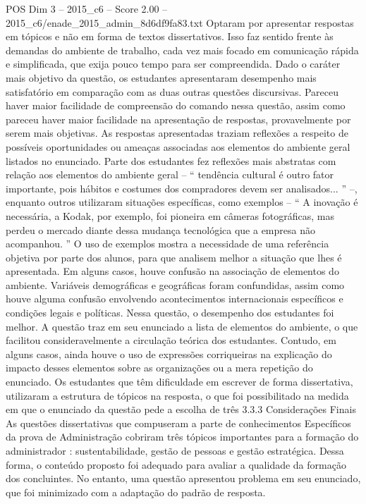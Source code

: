 \begin{textsample}{POS Dim 3 – 2015\_c6 – Score 2.00 – 2015\_c6/enade\_2015\_admin\_8d6df9fa83.txt}
Optaram por apresentar respostas em tópicos e não em forma de textos dissertativos.
Isso faz sentido frente às demandas do ambiente de trabalho, cada vez mais focado em comunicação rápida e simplificada, que exija pouco tempo para ser compreendida.
Dado o caráter mais objetivo da questão, os estudantes apresentaram desempenho mais satisfatório em comparação com as duas outras questões discursivas.
Pareceu haver maior facilidade de compreensão do comando nessa questão, assim como pareceu haver maior facilidade na apresentação de respostas, provavelmente por serem mais objetivas.
As respostas apresentadas traziam reflexões a respeito de possíveis oportunidades ou ameaças associadas aos elementos do ambiente geral listados no enunciado.
Parte dos estudantes fez reflexões mais abstratas com relação aos elementos do ambiente geral – “ tendência cultural é outro fator importante, pois hábitos e costumes dos compradores devem ser analisados... ” –, enquanto outros utilizaram situações específicas, como exemplos – “ A inovação é necessária, a Kodak, por exemplo, foi pioneira em câmeras fotográficas, mas perdeu o mercado diante dessa mudança tecnológica que a empresa não acompanhou. ” O uso de exemplos mostra a necessidade de uma referência objetiva por parte dos alunos, para que analisem melhor a situação que lhes é apresentada.
Em alguns casos, houve confusão na associação de elementos do ambiente.
Variáveis demográficas e geográficas foram confundidas, assim como houve alguma confusão envolvendo acontecimentos internacionais específicos e condições legais e políticas.
Nessa questão, o desempenho dos estudantes foi melhor.
A questão traz em seu enunciado a lista de elementos do ambiente, o que facilitou consideravelmente a circulação teórica dos estudantes.
Contudo, em alguns casos, ainda houve o uso de expressões corriqueiras na explicação do impacto desses elementos sobre as organizações ou a mera repetição do enunciado.
Os estudantes que têm dificuldade em escrever de forma dissertativa, utilizaram a estrutura de tópicos na resposta, o que foi possibilitado na medida em que o enunciado da questão pede a escolha de três 3.3.3 Considerações Finais As questões dissertativas que compuseram a parte de conhecimentos Específicos da prova de Administração cobriram três tópicos importantes para a formação do administrador : sustentabilidade, gestão de pessoas e gestão estratégica.
Dessa forma, o conteúdo proposto foi adequado para avaliar a qualidade da formação dos concluintes.
No entanto, uma questão apresentou problema em seu enunciado, que foi minimizado com a adaptação do padrão de resposta.

\end{textsample}
